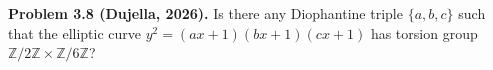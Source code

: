 \textbf{Problem 3.8 (Dujella, 2026).} Is there any Diophantine triple $\{a,b,c\}$ such that the elliptic curve $y^2=(ax+1)(bx+1)(cx+1)$ has torsion group $\mathbb{Z}/2\mathbb{Z}\times\mathbb{Z}/6\mathbb{Z}$?
